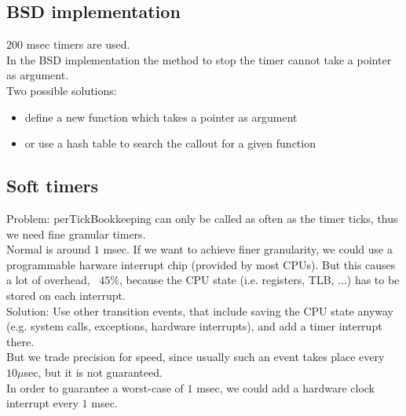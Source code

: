 \subsection{BSD implementation}

$200$ msec timers are used.\\

In the BSD implementation the method to stop the timer cannot take a pointer as argument.\\
Two possible solutions:
\begin{itemize}
\item define a new function which takes a pointer as argument
\item or use a hash table to search the callout for a given function
\end{itemize}

\subsection{Soft timers}

Problem: perTickBookkeeping can only be called as often as the timer ticks, thus we need fine granular timers. \\
Normal is around $1$ msec. If we want to achieve finer granularity, we could use a programmable harware interrupt chip (provided by most CPUs). But this causes a lot of overhead, ~$45$\%, because the CPU state (i.e. registers, TLB, ...) has to be stored on each interrupt.\\

Solution: Use other transition events, that include saving the CPU state anyway (e.g. system calls, exceptions, hardware interrupts), and add a timer interrupt there. \\
But we trade precision for speed, since usually such an event takes place every $10 \mu$sec, but it is not guaranteed.\\
In order to guarantee a worst-case of $1$ msec, we could add a hardware clock interrupt every $1$ msec.